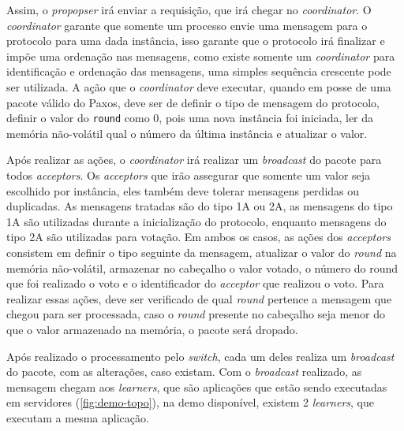 \documentclass[
    12pt,
    openright, 
    oneside,
    a4paper,
    french,
    english,
    brazil
    ]{facom-ufu-abntex2}
\theoremstyle{definition}
\begin{document}


Assim, o \emph{propopser} irá enviar a requisição, que irá chegar no \emph{coordinator}. O \emph{coordinator} garante que
somente um processo envie uma mensagem para o protocolo para uma dada instância, isso garante 
que o protocolo irá finalizar e impõe uma ordenação nas mensagens, como existe somente um
\emph{coordinator} para identificação e ordenação das mensagens, uma simples sequência crescente pode ser
utilizada. A ação que o \emph{coordinator} deve executar, quando em posse de uma pacote válido do Paxos,
deve ser de definir o tipo de mensagem do protocolo, definir o valor do \texttt{round} como 0, pois
uma nova instância foi iniciada, ler da memória não-volátil qual o número da última instância e atualizar
o valor\cite{dang2016paxos}.



Após realizar as ações, o \emph{coordinator} irá realizar um \emph{broadcast} do pacote para todos \emph{acceptors}.
Os \emph{acceptors} que irão assegurar que somente um valor seja escolhido por instância, eles também deve tolerar
mensagens perdidas ou duplicadas. As mensagens tratadas são do tipo 1A ou 2A, as mensagens do
tipo 1A são utilizadas durante a inicialização do protocolo, enquanto mensagens do tipo 2A são utilizadas
para votação. Em ambos os casos, as ações dos \emph{acceptors} consistem em definir o tipo seguinte da mensagem,
atualizar o valor do \emph{round} na memória não-volátil, armazenar no cabeçalho o valor votado, o número do
round que foi realizado o voto e o identificador do \emph{acceptor} que realizou o voto. Para realizar
essas ações, deve ser verificado de qual \emph{round} pertence a mensagem que chegou para ser processada,
caso o \emph{round} presente no cabeçalho seja menor do que o valor armazenado na memória, o pacote será 
dropado\cite{dang2016paxos}.



Após realizado o processamento pelo \emph{switch}, cada um deles realiza um \emph{broadcast} do pacote,
com as alterações, caso existam. Com o \emph{broadcast} realizado, as mensagem chegam aos
\emph{learners}, que são aplicações que estão sendo executadas em servidores (\ref{fig:demo-topo}), 
na demo disponível, existem 2 \emph{learners}, que executam a mesma aplicação.
\end{document}

